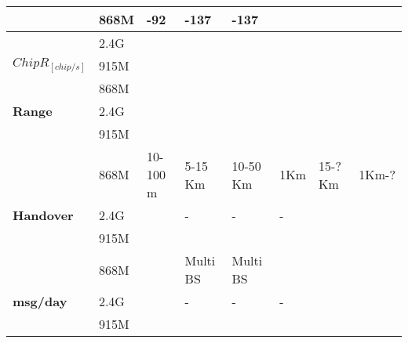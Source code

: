 \begin{longtable}{l|l|l|l|l|l|l|l}
	\                                    & 868M             & -92          & -137                   & -137          & \ko                                    & \ko               & \ko             \\\hline
	\multirow{3}{*}{$Chip R_{[chip/s]}$} & 2.4G             &              &                        &               &                                        &                   & \\
	\                                    & 915M             &              &                        &               &                                        &                   & \\
	\                                    & 868M             &              &                        &               &                                        &                   & \\\hline
	\bf{Range}                           & 2.4G             &              &                        &               &                                        &                   & \\
	\                                    & 915M             &              &                        &               &                                        &                   & \\
	\                                    & 868M             & 10-100 m     & 5-15 Km                & 10-50	Km      & 1Km                                    & 15-? Km           & 1Km-?           \\\hline
	\bf{Handover}                        & 2.4G             & \ko          & -                      & -             & -                                      & \ko               & \ko             \\
	\                                    & 915M             & \ko          & \ko                    & \ko           & \ko                                    & \ko               & \ko             \\
	\                                    & 868M             & \ko          & Multi \ac{BS}          & Multi	\ac{BS} & \ko                                    & \ko               & \ko             \\\hline
	\bf{msg/day}                         & 2.4G             & \ko          & -                      & -             & -                                      & \ko               & \ko             \\
	\                                    & 915M             & \ko          & \ko                    & \ko           & \ko                                    & \ko               & \ko             \\

\end{longtable}

